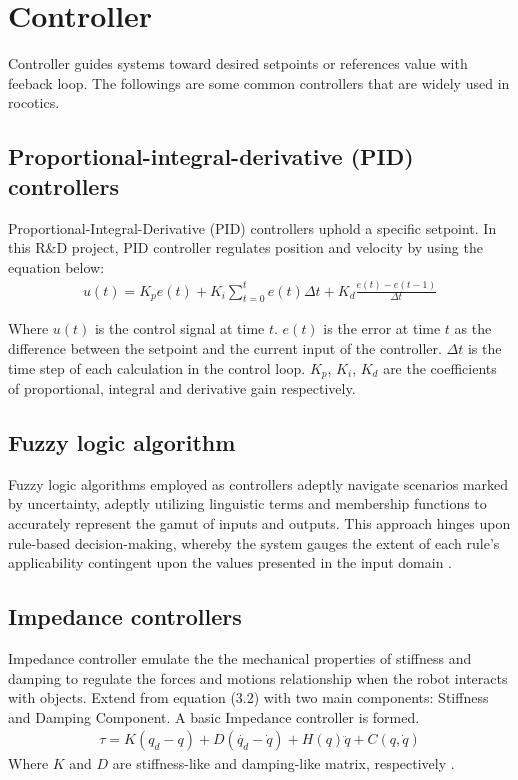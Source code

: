 \documentclass[report.tex]{subfiles}
\begin{document}
    \section{Controller}
    Controller guides systems toward desired setpoints or references value with feeback loop. The followings are some common controllers that are widely used in rocotics.
    \subsection{Proportional-integral-derivative (PID) controllers}
    Proportional-Integral-Derivative (PID) controllers uphold a specific setpoint. In this R\&D project, PID controller regulates position and velocity by using the equation below:
    \begin{align}
        u(t) = K_pe(t) + K_i\sum_{t=0}^{t} e(t) \Delta{t} + K_d \frac{e(t)-e(t-1)}{\Delta{t}}
    \end{align}

    Where $u(t)$ is the control signal at time $t$. $e(t)$ is the error at time $t$ as the difference between the setpoint and the current input of the controller. $\Delta{t}$ is the time step of each calculation in the control loop. $K_p$, $K_i$, $K_d$ are the coefficients of proportional, integral and derivative gain respectively\cite{johnson2005pid}.

    \subsection{Fuzzy logic algorithm}
    Fuzzy logic algorithms employed as controllers adeptly navigate scenarios marked by uncertainty, adeptly utilizing linguistic terms and membership functions to accurately represent the gamut of inputs and outputs. This approach hinges upon rule-based decision-making, whereby the system gauges the extent of each rule's applicability contingent upon the values presented in the input domain \cite{dadios2012fuzzy}.
    \subsection{Impedance controllers}
    Impedance controller emulate the the mechanical properties of stiffness and damping to regulate the forces and motions relationship when the robot interacts with objects. Extend from equation (3.2) with two main components: Stiffness and Damping Component. A basic Impedance controller is formed.
    \begin{align}
            \tau  = K(q_d -q) + D (\dot{q_d} - \dot{q}) + H(q)\ddot{q}+ C(q,\dot{q})
    \end{align}
    Where $K$ and $D$ are stiffness-like and damping-like matrix, respectively \cite{song2017impedance}.
\end{document}
